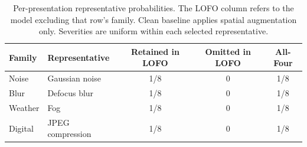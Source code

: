 \begin{table}[!htbp]
\centering
\small
\setlength{\tabcolsep}{5pt}
\caption{Per-presentation representative probabilities. The LOFO column refers to the model excluding that row's family. Clean baseline applies spatial augmentation only. Severities are uniform within each selected representative.}
\label{tab:exposure}
\begin{tabular}{llccc}
\toprule
Family & Representative & Retained in LOFO & Omitted in LOFO & All-Four \\
\midrule
Noise & Gaussian noise & 1/8 & 0 & 1/8 \\
Blur & Defocus blur & 1/8 & 0 & 1/8 \\
Weather & Fog & 1/8 & 0 & 1/8 \\
Digital & JPEG compression & 1/8 & 0 & 1/8 \\
\bottomrule
\end{tabular}
\end{table}
